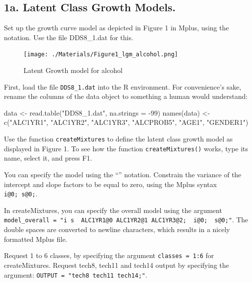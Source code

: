 \documentclass[
]{book}
\newenvironment{Shaded}{\begin{snugshade}}{\end{snugshade}}
\newcommand{\AttributeTok}[1]{\textcolor[rgb]{0.77,0.63,0.00}{#1}}
\newcommand{\DecValTok}[1]{\textcolor[rgb]{0.00,0.00,0.81}{#1}}
\newcommand{\FunctionTok}[1]{\textcolor[rgb]{0.00,0.00,0.00}{#1}}
\newcommand{\NormalTok}[1]{#1}
\newcommand{\OtherTok}[1]{\textcolor[rgb]{0.56,0.35,0.01}{#1}}
\newcommand{\SpecialCharTok}[1]{\textcolor[rgb]{0.00,0.00,0.00}{#1}}
\newcommand{\StringTok}[1]{\textcolor[rgb]{0.31,0.60,0.02}{#1}}
\begin{document}
\hypertarget{a.-latent-class-growth-models.}{%
\subsection{1a. Latent Class Growth Models.}\label{a.-latent-class-growth-models.}}

Set up the growth curve model as depicted in Figure 1 in Mplus, using the \textbar{} notation. Use the file DDS8\_1.dat for this.

\begin{figure}
\centering
\texttt{[image: ./Materials/Figure1\_lgm\_alcohol.png]}
\caption{Latent Growth model for alcohol}
\end{figure}

First, load the file \texttt{DDS8\_1.dat} into the R environment. For convenience's sake, rename the columns of the data object to something a human would understand:

\begin{Shaded}
\begin{Highlighting}[]
\NormalTok{data }\OtherTok{\textless{}{-}} \FunctionTok{read.table}\NormalTok{(}\StringTok{"DDS8\_1.dat"}\NormalTok{, }\AttributeTok{na.strings =} \SpecialCharTok{{-}}\DecValTok{99}\NormalTok{)}
\FunctionTok{names}\NormalTok{(data) }\OtherTok{\textless{}{-}} \FunctionTok{c}\NormalTok{(}\StringTok{"ALC1YR1"}\NormalTok{, }\StringTok{"ALC1YR2"}\NormalTok{, }\StringTok{"ALC1YR3"}\NormalTok{,}
                 \StringTok{"ALCPROB5"}\NormalTok{, }\StringTok{"AGE1"}\NormalTok{, }\StringTok{"GENDER1"}\NormalTok{)}
\end{Highlighting}
\end{Shaded}

Use the function \texttt{createMixtures} to define the latent class growth model as displayed in Figure 1. To see how the function \texttt{createMixtures()} works, type its name, select it, and press F1.

You can specify the model using the ``\textbar{}'' notation. Constrain the variance of the intercept and slope factors to be equal to zero, using the Mplus syntax \texttt{i@0;\ s@0;}.

In createMixtures, you can specify the overall model using the argument \texttt{model\_overall\ =\ "i\ s\ \textbar{}\ ALC1YR1@0\ ALC1YR2@1\ ALC1YR3@2;\ \ i@0;\ \ s@0;"}. The double spaces are converted to newline characters, which results in a nicely formatted Mplus file.

Request 1 to 6 classes, by specifying the argument \texttt{classes\ =\ 1:6} for createMixtures. Request tech8, tech11 and tech14 output by specifying the argument: \texttt{OUTPUT\ =\ "tech8\ tech11\ tech14;"}.
\end{document}
